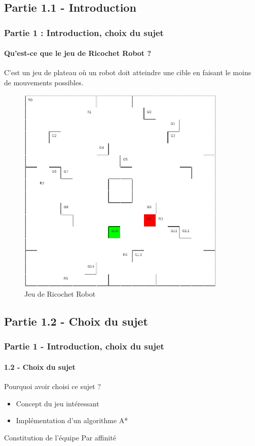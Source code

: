 \documentclass{beamer} %
\begin{document}
	\subsection{Partie 1.1 - Introduction}
\begin{frame}[plain]
\frametitle{Partie 1 : Introduction, choix du sujet}
\framesubtitle{Qu'est-ce que le jeu de Ricochet Robot ?}
C'est un jeu de plateau où un robot doit atteindre une cible en faisant le moins de mouvements possibles.
\begin{figure}
	\includegraphics[width=10cm]{images/visuBoard.png}
	\caption{Jeu de Ricochet Robot}
\end{figure}
\end{frame}

	\subsection{Partie 1.2 - Choix du sujet}
\begin{frame}[plain]
\frametitle{Partie 1 - Introduction, choix du sujet}
\framesubtitle{1.2 - Choix du sujet}
\begin{alertblock}{Pourquoi avoir choisi ce sujet ?}
	\begin{itemize}
		\item Concept du jeu intéressant
		\item Implémentation d'un algorithme A*
	\end{itemize}
\end{alertblock}
\bigbreak
\begin{exampleblock}{Constitution de l'équipe}
Par affinité 
\end{exampleblock}
\end{frame}
\end{document}
